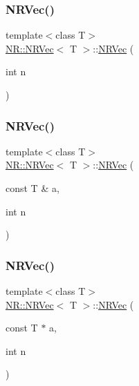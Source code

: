 \mbox{\label{classNR_1_1NRVec_a32e1c3a7b161ae48f90e95f44261c385}} 
\subsubsection{\texorpdfstring{NRVec()}{NRVec()}\hspace{0.1cm}{\footnotesize\ttfamily [7/10]}}
{\footnotesize\ttfamily template$<$class T$>$ \\
\mbox{\hyperlink{classNR_1_1NRVec}{N\+R\+::\+N\+R\+Vec}}$<$ T $>$\+::\mbox{\hyperlink{classNR_1_1NRVec}{N\+R\+Vec}} (\begin{DoxyParamCaption}\item[{int}]{n }\end{DoxyParamCaption})\hspace{0.3cm}{\ttfamily [explicit]}}

\mbox{\label{classNR_1_1NRVec_a876abf88c99fa23c45098f2f48369ec9}} 
\subsubsection{\texorpdfstring{NRVec()}{NRVec()}\hspace{0.1cm}{\footnotesize\ttfamily [8/10]}}
{\footnotesize\ttfamily template$<$class T$>$ \\
\mbox{\hyperlink{classNR_1_1NRVec}{N\+R\+::\+N\+R\+Vec}}$<$ T $>$\+::\mbox{\hyperlink{classNR_1_1NRVec}{N\+R\+Vec}} (\begin{DoxyParamCaption}\item[{const T \&}]{a,  }\item[{int}]{n }\end{DoxyParamCaption})}

\mbox{\label{classNR_1_1NRVec_a20980fe6d9976332123225c883fbe67d}} 
\subsubsection{\texorpdfstring{NRVec()}{NRVec()}\hspace{0.1cm}{\footnotesize\ttfamily [9/10]}}
{\footnotesize\ttfamily template$<$class T$>$ \\
\mbox{\hyperlink{classNR_1_1NRVec}{N\+R\+::\+N\+R\+Vec}}$<$ T $>$\+::\mbox{\hyperlink{classNR_1_1NRVec}{N\+R\+Vec}} (\begin{DoxyParamCaption}\item[{const T $\ast$}]{a,  }\item[{int}]{n }\end{DoxyParamCaption})}

